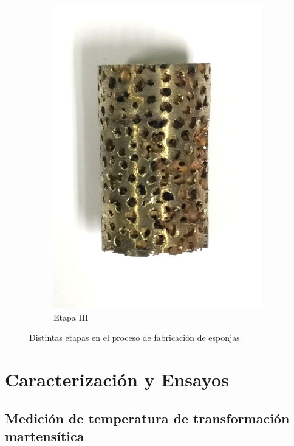 \documentclass[a4paper,12pt,fleqn,twoside,openany]{book}
\begin{document}
\begin{figure}[h]
\begin{subfigure}{0.28\textwidth}
        \includegraphics[width=\textwidth]{Img/Procedimiento/proceso3.jpg}
        \caption{Etapa III}
        \label{fig:proceso3}
    \end{subfigure}
  \label{fig: proceso}
  \caption{Distintas etapas en el proceso de fabricación de esponjas}
\end{figure}


\section{Caracterización y Ensayos}



\subsection{Medición de temperatura de transformación martensítica}
\end{document}
